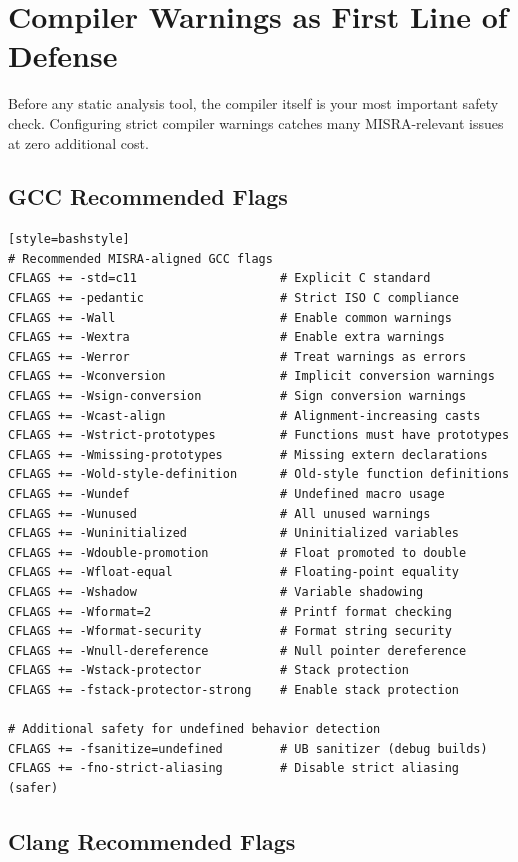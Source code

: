\documentclass[11pt,letterpaper]{report}
\begin{document}
\chapter{Compiler Warnings as First Line of Defense}

Before any static analysis tool, the compiler itself is your most important safety check. Configuring strict compiler warnings catches many MISRA-relevant issues at zero additional cost.

\section{GCC Recommended Flags}

\begin{verbatim}[style=bashstyle]
# Recommended MISRA-aligned GCC flags
CFLAGS += -std=c11                    # Explicit C standard
CFLAGS += -pedantic                   # Strict ISO C compliance
CFLAGS += -Wall                       # Enable common warnings
CFLAGS += -Wextra                     # Enable extra warnings
CFLAGS += -Werror                     # Treat warnings as errors
CFLAGS += -Wconversion                # Implicit conversion warnings
CFLAGS += -Wsign-conversion           # Sign conversion warnings
CFLAGS += -Wcast-align                # Alignment-increasing casts
CFLAGS += -Wstrict-prototypes         # Functions must have prototypes
CFLAGS += -Wmissing-prototypes        # Missing extern declarations
CFLAGS += -Wold-style-definition      # Old-style function definitions
CFLAGS += -Wundef                     # Undefined macro usage
CFLAGS += -Wunused                    # All unused warnings
CFLAGS += -Wuninitialized             # Uninitialized variables
CFLAGS += -Wdouble-promotion          # Float promoted to double
CFLAGS += -Wfloat-equal               # Floating-point equality
CFLAGS += -Wshadow                    # Variable shadowing
CFLAGS += -Wformat=2                  # Printf format checking
CFLAGS += -Wformat-security           # Format string security
CFLAGS += -Wnull-dereference          # Null pointer dereference
CFLAGS += -Wstack-protector           # Stack protection
CFLAGS += -fstack-protector-strong    # Enable stack protection

# Additional safety for undefined behavior detection
CFLAGS += -fsanitize=undefined        # UB sanitizer (debug builds)
CFLAGS += -fno-strict-aliasing        # Disable strict aliasing (safer)
\end{verbatim}

\section{Clang Recommended Flags}
\end{document}
